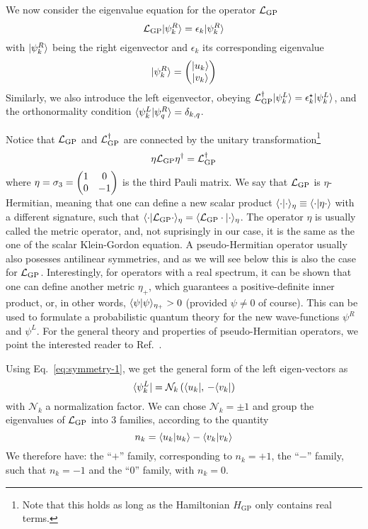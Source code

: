 We now consider the eigenvalue equation for the operator $\mathcal{L}_{\text{GP}}$
%
\begin{equation}\label{eq:L-eigen}
  \mathcal{L}_{\text{GP}} \vert \psi_k^R \rangle = \epsilon_k \vert \psi_k^R \rangle
\end{equation}
% 
with $\vert \psi_k^R \rangle$ being the right eigenvector and $\epsilon_k$ its
corresponding eigenvalue
%
\begin{equation}\label{eq:psi-R}
  \vert \psi_k^R \rangle = \begin{pmatrix} \vert u_k \rangle\\ \vert v_k \rangle \end{pmatrix}
\end{equation}
% 
Similarly, we also introduce the left eigenvector, obeying
$\mathcal{L}_{\text{GP}}^{\dagger} \vert \psi_k^L \rangle = \epsilon_k^{\star} \vert \psi_k^L \rangle$,
and the orthonormality condition
$\langle \psi_k^L \vert \psi_q^R \rangle = \delta_{k,q}$. 

Notice that $\mathcal{L}_{\text{GP}}$ and $\mathcal{L}_{\text{GP}}^{\dagger}$ are
connected by the unitary transformation\footnote{Note that this holds
  as long as the Hamiltonian $H_{\text{GP}}$ only contains real
  terms.}
%
\begin{equation}\label{eq:symmetry-1}
  \eta \mathcal{L}_{\text{GP}} \eta^{\dagger} = \mathcal{L}_{\text{GP}}^{\dagger}
\end{equation}
% 
where $\eta = \sigma_3 = \begin{pmatrix} 1 & 0\\ 0 & -1 \end{pmatrix}$ is the third Pauli
matrix. We say that $\mathcal{L}_{\text{GP}}$ is $\eta$-Hermitian, meaning
that one can define a new scalar product
$\langle \cdot \vert \cdot \rangle_{\eta} \equiv \langle \cdot \vert \eta \cdot \rangle$ with a
different signature, such that
$\langle \cdot \vert \mathcal{L}_{\text{GP}} \cdot \rangle_{\eta} =
\langle \mathcal{L}_{\text{GP}} \cdot \vert \cdot \rangle_{\eta}$. The operator $\eta$ is
usually called the metric operator, and, not suprisingly in our case,
it is the same as the one of the scalar Klein-Gordon equation. A
pseudo-Hermitian operator usually also posesses antilinear symmetries,
and as we will see below this is also the case for
$\mathcal{L}_{\text{GP}}$. Interestingly, for operators with a real spectrum,
it can be shown that one can define another metric $\eta_+$, which
guarantees a positive-definite inner product, or, in other words,
$\langle \psi \vert \psi \rangle_{\eta_+} > 0$ (provided $\psi \neq 0$ of
course). This can be used to formulate a probabilistic quantum theory
for the new wave-functions $\psi^R$ and $\psi^L$. For the general
theory and properties of pseudo-Hermitian operators, we point the
interested reader to Ref.~\cite{MOSTAFAZADEH_2010}.


Using Eq.~\eqref{eq:symmetry-1}, we get the general form of the left
eigen-vectors as
%
\begin{equation}\label{eq:psi-L}
  \langle \psi_k^L \vert = \mathcal{N}_k \left( \langle u_k \vert,\, -\langle v_k \vert \right)
\end{equation}
% 
with $\mathcal{N}_k$ a normalization factor.  We can chose
$\mathcal{N}_k = \pm 1$ and group the eigenvalues of $\mathcal{L}_{\text{GP}}$
into 3 families, according to the quantity
%
\begin{equation}\label{eq:norms}
  n_k = \langle u_k \vert u_k \rangle - \langle v_k \vert v_k \rangle
\end{equation}
% 
We therefore have: the ``$+$'' family, corresponding to $n_k=+1$, the
``$-$'' family, such that $n_k=-1$ and the ``$0$'' family, with
$n_k=0$.

